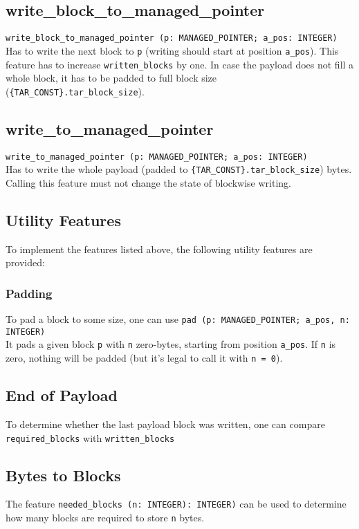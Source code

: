 \subsection{write\_block\_to\_managed\_pointer}
\lstinline|write_block_to_managed_pointer (p: MANAGED_POINTER; a_pos: INTEGER)| \\
Has to write the next block to \lstinline;p; (writing should start at position
\lstinline;a_pos;). This feature has to increase \lstinline;written_blocks; by
one.
In case the payload does not fill a whole block, it has to be padded to full
block size (\lstinline|{TAR_CONST}.tar_block_size|).

\subsection{write\_to\_managed\_pointer}
\lstinline|write_to_managed_pointer (p: MANAGED_POINTER; a_pos: INTEGER)| \\
Has to write the whole payload (padded to
\lstinline|{TAR_CONST}.tar_block_size|) bytes. Calling this feature must not
change the state of blockwise writing.

\subsection{Utility Features}
To implement the features listed above, the following utility features are
provided:

\subsubsection{Padding}
To pad a block to some size, one can use
\lstinline|pad (p: MANAGED_POINTER; a_pos, n: INTEGER)|\\
It pads a given block \lstinline;p; with \lstinline;n; zero-bytes, starting
from position \lstinline;a_pos;. If \lstinline|n| is zero, nothing will be
padded (but it's legal to call it with \lstinline|n = 0|).

\subsection{End of Payload}
To determine whether the last payload block was written, one can compare
\lstinline;required_blocks; with \lstinline;written_blocks;

\subsection{Bytes to Blocks}
The feature \lstinline|needed_blocks (n: INTEGER): INTEGER)| can be used to
determine how many blocks are required to store \lstinline;n; bytes.
